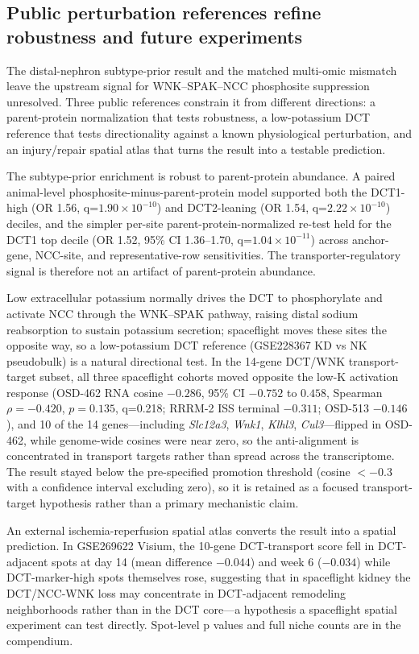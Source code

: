 \documentclass[11pt]{article}
\newcommand{\gene}[1]{\textit{#1}}
\begin{document}
\subsection{Public perturbation references refine robustness and future experiments}

The distal-nephron subtype-prior result and the matched multi-omic mismatch leave the upstream signal for WNK--SPAK--NCC phosphosite suppression unresolved. Three public references constrain it from different directions: a parent-protein normalization that tests robustness, a low-potassium DCT reference that tests directionality against a known physiological perturbation, and an injury/repair spatial atlas that turns the result into a testable prediction.

The subtype-prior enrichment is robust to parent-protein abundance. A paired animal-level phosphosite-minus-parent-protein model supported both the DCT1-high (OR 1.56, q=$1.90\times10^{-10}$) and DCT2-leaning (OR 1.54, q=$2.22\times10^{-10}$) deciles, and the simpler per-site parent-protein-normalized re-test held for the DCT1 top decile (OR 1.52, 95\% CI 1.36--1.70, q=$1.04\times10^{-11}$) across anchor-gene, NCC-site, and representative-row sensitivities. The transporter-regulatory signal is therefore not an artifact of parent-protein abundance.

Low extracellular potassium normally drives the DCT to phosphorylate and activate NCC through the WNK--SPAK pathway, raising distal sodium reabsorption to sustain potassium secretion; spaceflight moves these sites the opposite way, so a low-potassium DCT reference (GSE228367 KD vs NK pseudobulk) is a natural directional test. In the 14-gene DCT/WNK transport-target subset, all three spaceflight cohorts moved opposite the low-K activation response (OSD-462 RNA cosine $-0.286$, 95\% CI $-0.752$ to $0.458$, Spearman $\rho=-0.420$, $p=0.135$, q=0.218; RRRM-2 ISS terminal $-0.311$; OSD-513 $-0.146$), and 10 of the 14 genes---including \gene{Slc12a3}, \gene{Wnk1}, \gene{Klhl3}, \gene{Cul3}---flipped in OSD-462, while genome-wide cosines were near zero, so the anti-alignment is concentrated in transport targets rather than spread across the transcriptome. The result stayed below the pre-specified promotion threshold (cosine $<-0.3$ with a confidence interval excluding zero), so it is retained as a focused transport-target hypothesis rather than a primary mechanistic claim.

An external ischemia-reperfusion spatial atlas converts the result into a spatial prediction. In GSE269622 Visium, the 10-gene DCT-transport score fell in DCT-adjacent spots at day 14 (mean difference $-0.044$) and week 6 ($-0.034$) while DCT-marker-high spots themselves rose, suggesting that in spaceflight kidney the DCT/NCC-WNK loss may concentrate in DCT-adjacent remodeling neighborhoods rather than in the DCT core---a hypothesis a spaceflight spatial experiment can test directly. Spot-level p values and full niche counts are in the compendium.
\end{document}
